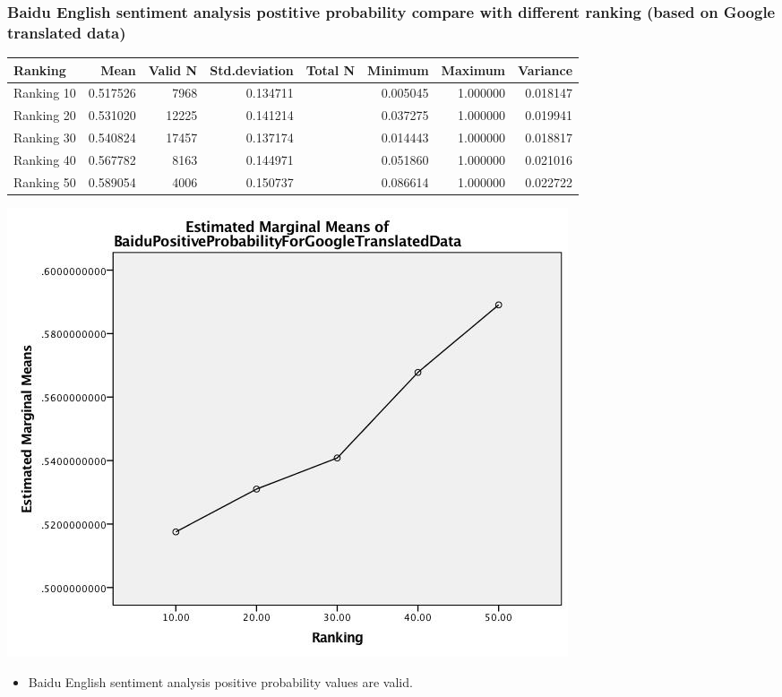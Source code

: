 \subsubsection{Baidu English sentiment analysis postitive probability compare with different ranking (based on Google translated data)}
\label{sec:orgd634f3e}
\begin{center}
\begin{tabular}{lrrrlrrr}
Ranking & Mean & Valid N & Std.deviation & Total N & Minimum & Maximum & Variance\\
\hline
Ranking 10 & 0.517526 & 7968 & 0.134711 &  & 0.005045 & 1.000000 & 0.018147\\
Ranking 20 & 0.531020 & 12225 & 0.141214 &  & 0.037275 & 1.000000 & 0.019941\\
Ranking 30 & 0.540824 & 17457 & 0.137174 &  & 0.014443 & 1.000000 & 0.018817\\
Ranking 40 & 0.567782 & 8163 & 0.144971 &  & 0.051860 & 1.000000 & 0.021016\\
Ranking 50 & 0.589054 & 4006 & 0.150737 &  & 0.086614 & 1.000000 & 0.022722\\
\end{tabular}
\end{center}
\begin{center}
\includegraphics[width=.9\linewidth]{./img/MarginalMeansOfBaiduPositiveProbabilityForGoogleTranslatedData.jpg}
\end{center}

\begin{itemize}
\item Baidu English sentiment analysis positive probability values are valid.
\end{itemize}
